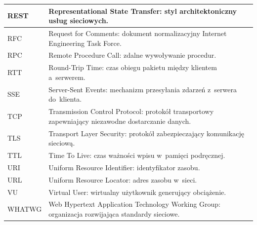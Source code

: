 \documentclass{PracaDyplomowa}
\begin{document}
{\begin{longtable}{|p{2.8cm}|p{10.8cm}|}
\hline
REST & Representational State Transfer: styl architektoniczny usług sieciowych. \\
\hline
RFC & Request for Comments: dokument normalizacyjny Internet Engineering Task Force. \\
\hline
RPC & Remote Procedure Call: zdalne wywoływanie procedur. \\
\hline
RTT & Round-Trip Time: czas obiegu pakietu między klientem a~serwerem. \\
\hline
SSE & Server-Sent Events: mechanizm przesyłania zdarzeń z~serwera do~klienta. \\
\hline
TCP & Transmission Control Protocol: protokół transportowy zapewniający niezawodne dostarczanie danych. \\
\hline
TLS & Transport Layer Security: protokół zabezpieczający komunikację sieciową. \\
\hline
TTL & Time To Live: czas ważności wpisu w~pamięci podręcznej. \\
\hline
URI & Uniform Resource Identifier: identyfikator zasobu. \\
\hline
URL & Uniform Resource Locator: adres zasobu w~sieci. \\
\hline
VU & Virtual User: wirtualny użytkownik generujący obciążenie. \\
\hline
WHATWG & Web Hypertext Application Technology Working Group: organizacja rozwijająca standardy sieciowe. \\
\hline
\end{longtable}
}











\end{document}
